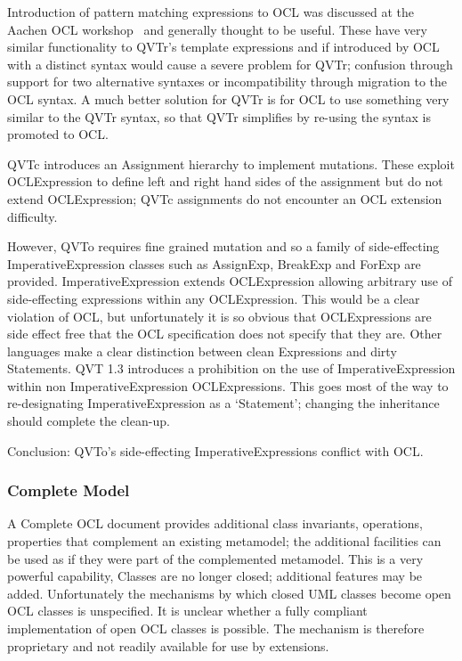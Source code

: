 \documentclass{llncs}
\begin{document}
Introduction of pattern matching expressions to OCL was discussed at the Aachen OCL workshop~\cite{aachen} and generally thought to be useful. These have very similar functionality to QVTr's template expressions and if introduced by OCL with a distinct syntax would cause a severe problem for QVTr; confusion through support for two alternative syntaxes or incompatibility through migration to the OCL syntax. A much better solution for QVTr is for OCL to use something very similar to the QVTr syntax, so that QVTr simplifies by re-using the syntax is promoted to OCL.

QVTc introduces an Assignment hierarchy to implement mutations. These exploit OCLExpression to define left and right hand sides of the assignment but do not extend OCLExpression; QVTc assignments do not encounter an OCL extension difficulty.

However, QVTo requires fine grained mutation and so a family of side-effecting ImperativeExpression classes such as AssignExp, BreakExp and ForExp are provided. ImperativeExpression extends OCLExpression allowing arbitrary use of side-effecting expressions within any OCLExpression. This would be a clear violation of OCL, but unfortunately it is so obvious that OCLExpressions are side effect free that the OCL specification does not specify that they are. Other languages make a clear distinction between clean Expressions and dirty Statements.  QVT 1.3 introduces a prohibition on the use of ImperativeExpression within non ImperativeExpression OCLExpressions. This goes most of the way to re-designating ImperativeExpression as a `Statement'; changing the inheritance should complete the clean-up.

Conclusion: QVTo's side-effecting ImperativeExpressions conflict with OCL.

\subsubsection{Complete Model}

A Complete OCL document provides additional class invariants, operations, properties that complement an existing metamodel; the additional facilities can be used as if they were part of the complemented metamodel. This is a very powerful capability, Classes are no longer closed; additional features may be added. Unfortunately the mechanisms by which closed UML classes become open OCL classes is unspecified. It is unclear whether a fully compliant implementation of open OCL classes is possible. The mechanism is therefore proprietary and not readily available for use by extensions.
\end{document}
